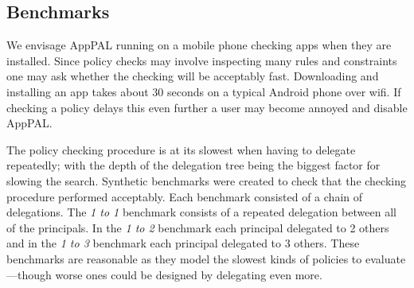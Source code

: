 \documentclass[]{llncs}
\begin{document}
%
%

\subsection{Benchmarks}
\label{ssec:benchmarks}

We envisage AppPAL running on a mobile phone checking apps when they are installed.
Since policy checks may involve inspecting many rules and constraints one may ask whether the checking will be acceptably fast.
Downloading and installing an app takes about 30 seconds on a typical Android phone over wifi.
If checking a policy delays this even further a user may become annoyed and disable AppPAL.

The policy checking procedure is at its slowest when having to delegate repeatedly;
  with the depth of the delegation tree being the biggest factor for slowing the search.
Synthetic benchmarks were created to check that the checking procedure performed acceptably.
Each benchmark consisted of a chain of delegations.
The \emph{1 to 1} benchmark consists of a repeated delegation between all of the principals.
In the \emph{1 to 2} benchmark each principal delegated to 2 others and in the \emph{1 to 3} benchmark each principal delegated to 3 others.
These benchmarks are reasonable as they model the slowest kinds of policies to evaluate---though worse ones could be designed by delegating even more.
\end{document}
